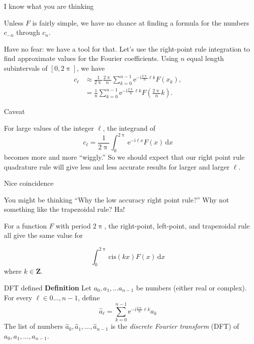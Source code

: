 \documentclass[portrait,fleqn,12pt]{beamer}
\newcommand{\integers}{\mathbf{Z}}
\newcommand{\cis}{\mathrm{cis}}
\newcommand{\euler}{\mathrm{e}}
\newcommand{\imag}{\mathrm{i}}
\newenvironment{define}[1]{
  \textbf{Definition} #1}{}
\begin{document}
 \begin{frame}{I know what you are thinking}
 
 Unless $F$ is fairly simple, we have no chance at finding a formula for the numbers $c_{-n}$ through $c_n$.  
 
 Have no fear: we have
 a tool for that.  Let's use the right-point rule integration to find approximate values for the Fourier coefficients. Using $n$ equal length 
 subintervals of $[0, 2 \uppi]$, we have
\begin{align*}
  c_\ell &\approx \frac{1}{2 \uppi}  \frac{2 \uppi}{n} \sum_{k=0}^{n-1}  \euler^{-  \imag \frac{2 \uppi}{n}  \ell  k} F(x_k), \\
            &=  \frac{1}{n} \sum_{k=0}^{n-1}  \euler^{-  \imag \frac{2 \uppi}{n}  \ell  k} F \left (\frac{2 \uppi}{n} k \right).
\end{align*}
 
  \end{frame}
  
  \begin{frame}{Caveat}
  
  For large values of the integer $\ell$, the integrand of
  \begin{equation*}
   c_\ell = \frac{1}{2 \uppi} \int_0^{2 \uppi} \euler^{-\imag  \ell x} F(x) \, \mathrm{d}x
\end{equation*}
becomes more and more ``wiggly.''  So we should expect that our right point rule quadrature rule will give less and less 
accurate results for larger and larger $\ell$.
  
  \vfill
  
  
  \end{frame}
  
  \begin{frame}{Nice coincidence}
  
  You might be thinking ``Why the low accuracy right point rule?'' Why not something like the trapezoidal rule?  Ha!
  
  For a function $F$ with period $2 \uppi$, the right-point, left-point, and trapezoidal rule all give the same value for
  
  \begin{equation}
     \int_0^{2 \uppi} \cis(k x) F(x) \, \mathrm{d} x
  \end{equation}
  where $k \in \integers$.
  
  \end{frame}
  
  \begin{frame}{DFT defined}
  \begin{define}  Let $a_0, a_1, \dots a_{n-1}$ be numbers (either real or complex).   For every $\ell \in 0 \dots, n-1$, define
  \begin{equation*}
      \widehat a_\ell = \sum_{k=0}^{n-1}  \euler^{-  \imag \frac{2 \uppi}{n}  \ell  k} a_k
  \end{equation*}
  The list of numbers  $\widehat a_0,  \widehat a_1, \dots, \widehat a_{n-1}$ is the \emph{discrete Fourier transform} (DFT) of 
  $a_0, a_1, \dots, a_{n-1}$.
  
  \end{define}
  \end{frame}
  
\end{document}
